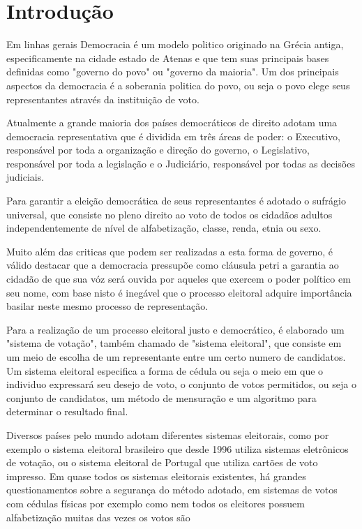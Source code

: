 \section{Introdução}
Em linhas gerais Democracia é um modelo politico originado na Grécia antiga, 
especificamente na cidade estado de Atenas e que tem suas principais bases 
definidas como "governo do povo" ou "governo da maioria". Um dos principais aspectos
da democracia é a soberania politica do povo, ou seja o povo elege seus representantes
através da instituição de voto. \par
Atualmente a grande maioria dos países democráticos de direito adotam uma 
democracia representativa que é dividida em três áreas de poder: o Executivo, responsável por toda a organização
e direção do governo, o Legislativo, responsável por toda a legislação e o Judiciário,
responsável por todas as decisões judiciais. \par
Para garantir a eleição democrática de seus representantes é adotado o sufrágio 
universal, que consiste no pleno direito ao voto de todos os cidadãos adultos 
independentemente de nível de alfabetização, classe, renda, etnia ou sexo. \par
Muito além das criticas que podem ser realizadas a esta forma de governo, é válido
destacar que a democracia pressupõe como cláusula petri a garantia ao cidadão de
que sua vóz será ouvida por aqueles que exercem o poder político em seu nome, 
com base nisto é inegável que o processo eleitoral adquire importância basilar
neste mesmo processo de representação. \par
Para a realização de um processo eleitoral justo e democrático, é elaborado um 
"sistema de votação", também chamado de "sistema eleitoral", que consiste em um
meio de escolha de um representante entre um certo numero de candidatos.
Um sistema eleitoral especifica a forma de cédula ou seja o meio em que o individuo
expressará seu desejo de voto, o conjunto de votos permitidos, ou seja o conjunto 
de candidatos, um método de mensuração e um algoritmo para determinar o 
resultado final. \par
Diversos países pelo mundo adotam diferentes sistemas eleitorais, como por exemplo
o sistema eleitoral brasileiro que desde 1996 utiliza sistemas eletrônicos de votação,
ou o sistema eleitoral de Portugal que utiliza cartões de voto impresso.
Em quase todos os sistemas eleitorais existentes, há grandes questionamentos sobre
a segurança do método adotado, em sistemas de votos com cédulas físicas por exemplo
como nem todos os eleitores possuem alfabetização muitas das vezes os votos são
